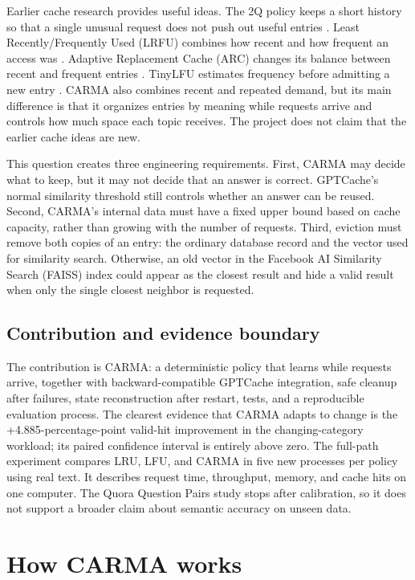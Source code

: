 \documentclass[10pt,letterpaper]{article}
\begin{document}
Earlier cache research provides useful ideas. The 2Q policy keeps a short
history so that a single unusual request does not push out useful entries
\cite{twoq}. Least Recently/Frequently Used (LRFU) combines how recent and how
frequent an access was \cite{lrfu}. Adaptive Replacement Cache (ARC) changes
its balance between recent and frequent entries \cite{arc}. TinyLFU estimates
frequency before admitting a new entry \cite{tinylfu}. CARMA also combines
recent and repeated demand, but its main difference is that it organizes
entries by meaning while requests arrive and controls how much space each
topic receives. The project does not claim that the earlier cache ideas are
new.

This question creates three engineering requirements. First, CARMA may decide
what to keep, but it may not decide that an answer is correct. GPTCache's
normal similarity threshold still controls whether an answer can be reused.
Second, CARMA's internal data must have a fixed upper bound based on cache
capacity, rather than growing with the number of requests. Third, eviction must
remove both copies of an entry: the ordinary database record and the vector
used for similarity search. Otherwise, an old vector in the Facebook AI
Similarity Search (FAISS) index could appear as the closest result and hide a
valid result when only the single closest neighbor is requested.

\subsection*{Contribution and evidence boundary}

The contribution is CARMA: a deterministic policy that learns while requests
arrive, together with backward-compatible GPTCache integration, safe cleanup
after failures, state reconstruction after restart, tests, and a reproducible
evaluation process. The clearest evidence that CARMA adapts to change is the
+4.885-percentage-point valid-hit improvement in the changing-category
workload; its paired confidence interval is entirely above zero. The full-path
experiment compares LRU, LFU, and CARMA in five new processes per policy using
real text. It describes request time, throughput, memory, and cache hits on one
computer. The Quora Question Pairs study stops after calibration, so it does
not support a broader claim about semantic accuracy on unseen data.

\section{How CARMA works}
\end{document}
